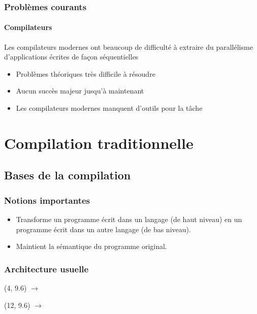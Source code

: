 \documentclass{beamer}
\begin{document}
\begin{frame}
\frametitle{Problèmes courants}
\framesubtitle{Compilateurs}
Les compilateurs modernes ont beaucoup de difficulté à extraire du parallélisme d'applications écrites de façon séquentielles
\begin{itemize}
\item Problèmes théoriques très difficile à résoudre
\item Aucun succès majeur jusqu'à maintenant
\item Les compilateurs modernes manquent d'outils pour la tâche
\end{itemize}
\end{frame}

\section{Compilation traditionnelle}
\subsection{Bases de la compilation}
\begin{frame}
\frametitle{Notions importantes}
\begin{itemize}
\item Transforme un programme écrit dans un langage (de haut niveau) en un programme écrit dans un autre langage (de bas niveau).
\item Maintient la sémantique du programme original.
\end{itemize}
\end{frame}

\begin{frame}
\frametitle{Architecture usuelle}
\begin{center}
\end{center}
\begin{textblock}{6}(4, 9.6)
$\rightarrow$
\end{textblock}
\begin{textblock}{6}(12, 9.6)
$\rightarrow$
\end{textblock}
\end{frame}
\end{document}
